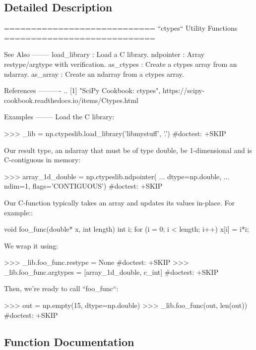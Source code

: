 \subsection{Detailed Description}
\begin{DoxyVerb}============================
``ctypes`` Utility Functions
============================

See Also
--------
load_library : Load a C library.
ndpointer : Array restype/argtype with verification.
as_ctypes : Create a ctypes array from an ndarray.
as_array : Create an ndarray from a ctypes array.

References
----------
.. [1] "SciPy Cookbook: ctypes", https://scipy-cookbook.readthedocs.io/items/Ctypes.html

Examples
--------
Load the C library:

>>> _lib = np.ctypeslib.load_library('libmystuff', '.')     #doctest: +SKIP

Our result type, an ndarray that must be of type double, be 1-dimensional
and is C-contiguous in memory:

>>> array_1d_double = np.ctypeslib.ndpointer(
...                          dtype=np.double,
...                          ndim=1, flags='CONTIGUOUS')    #doctest: +SKIP

Our C-function typically takes an array and updates its values
in-place.  For example::

    void foo_func(double* x, int length)
    {
        int i;
        for (i = 0; i < length; i++) {
            x[i] = i*i;
        }
    }

We wrap it using:

>>> _lib.foo_func.restype = None                      #doctest: +SKIP
>>> _lib.foo_func.argtypes = [array_1d_double, c_int] #doctest: +SKIP

Then, we're ready to call ``foo_func``:

>>> out = np.empty(15, dtype=np.double)
>>> _lib.foo_func(out, len(out))                #doctest: +SKIP\end{DoxyVerb}
 

\subsection{Function Documentation}
\mbox{\label{namespacenumpy_1_1ctypeslib_a8e6a6d1304a80b484c3c410d224e3983}} 
